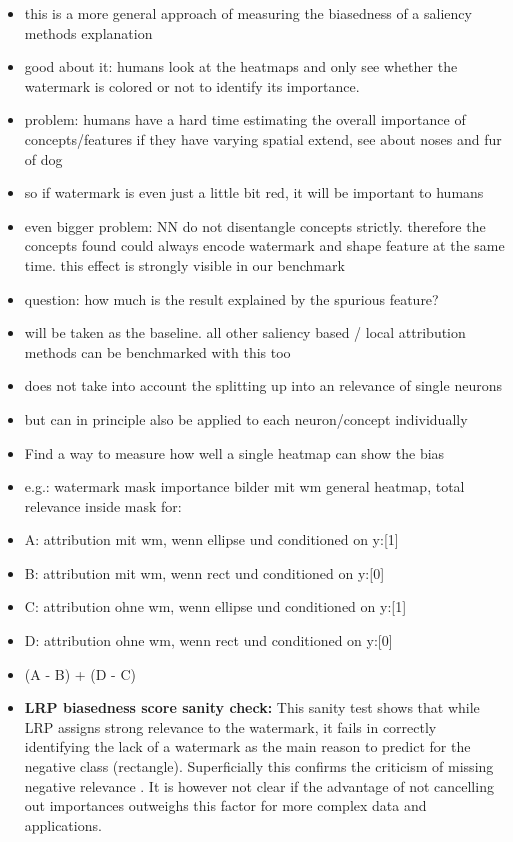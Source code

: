 \begin{itemize}
    \item this is a more general approach of measuring the biasedness of a saliency methods explanation
    \item good about it: humans look at the heatmaps and only see whether the watermark is colored or not to identify its importance. 
    \item problem: humans have a hard time estimating the overall importance of concepts/features if they have varying spatial extend, see \cite{Achtibat2022} about noses and fur of dog
    \item so if watermark is even just a little bit red, it will be important to humans
    \item even bigger problem: NN do not disentangle concepts strictly. therefore the concepts found could always encode watermark and shape feature at the same time. this effect is strongly visible in our benchmark 
    \item question: how much is the result explained by the spurious feature?
    \item will be taken as the baseline. all other saliency based / local attribution methods can be benchmarked with this too
    \item does not take into account the splitting up into an relevance of single neurons
    \item but can in principle also be applied to each neuron/concept individually
    \item Find a way to measure how well a single heatmap can show the bias
    \item e.g.: watermark mask importance bilder mit wm general heatmap, total relevance inside mask for:
    \item A: attribution mit wm, wenn ellipse und conditioned on y:[1]
    \item B: attribution mit wm, wenn rect    und conditioned on y:[0]
    \item C: attribution ohne wm, wenn ellipse und conditioned on y:[1]
    \item D: attribution ohne wm, wenn rect    und conditioned on y:[0]
    \item (A - B) + (D - C)
    \item \textbf{LRP biasedness score sanity check:} 
    This sanity test shows that while LRP assigns strong relevance to the watermark, it fails in correctly identifying the lack of a watermark as the main reason to predict for the negative class (rectangle). Superficially this confirms the criticism of missing negative relevance \cite{Sixt2020}. It is however not clear if the advantage of not cancelling out importances outweighs this factor for more complex data and applications.  

    
\end{itemize}

